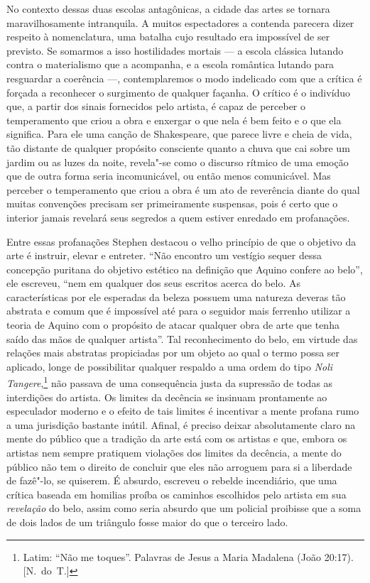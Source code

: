 No contexto dessas duas escolas antagônicas, a cidade das artes se
tornara maravilhosamente intranquila.  A muitos espectadores a contenda
parecera dizer respeito à nomenclatura, uma batalha cujo resultado era
impossível de ser previsto.  Se somarmos a isso hostilidades mortais ---
a escola clássica lutando contra o materialismo que a acompanha, e a
escola romântica lutando para resguardar a coerência ---,
contemplaremos o modo indelicado com que a crítica é forçada a
reconhecer o surgimento de qualquer façanha.  O crítico é o indivíduo
que, a partir dos sinais fornecidos pelo artista, é capaz de perceber o
temperamento que criou a obra e enxergar o que nela é bem feito e o que
ela significa.  Para ele uma canção de Shakespeare, que parece livre e
cheia de vida, tão distante de qualquer propósito consciente quanto a
chuva que cai sobre um jardim ou as luzes da noite, revela"-se como o
discurso rítmico de uma emoção que de outra forma seria incomunicável,
ou então menos comunicável.  Mas perceber o temperamento que criou a
obra é um ato de reverência diante do qual muitas convenções precisam
ser primeiramente suspensas, pois é certo que o interior jamais
revelará seus segredos a quem estiver enredado em profanações.

Entre essas profanações Stephen destacou o velho princípio de que o
objetivo da arte é instruir, elevar e entreter.  “Não encontro um		
vestígio sequer dessa concepção puritana do objetivo estético na
definição que Aquino confere ao belo”, ele escreveu, “nem em qualquer
dos seus escritos acerca do belo.  As características por ele esperadas
da beleza possuem uma natureza deveras tão abstrata e comum que é
impossível até para o seguidor mais ferrenho utilizar a teoria de
Aquino com o propósito de atacar qualquer obra de arte que tenha saído
das mãos de qualquer artista”.  Tal reconhecimento do belo, em virtude
das relações mais abstratas propiciadas por um objeto ao qual o termo
possa ser aplicado, longe de possibilitar qualquer respaldo a uma ordem
do tipo \textit{Noli Tangere},\footnote{ Latim: “Não me toques”.
Palavras de Jesus a Maria Madalena (João 20:17). [N.~do~T.]} não passava
de uma consequência justa da supressão de todas as interdições do
artista.  Os limites da decência se insinuam prontamente ao especulador
moderno e o efeito de tais limites é incentivar a mente profana rumo a
uma jurisdição bastante inútil.  Afinal, é preciso deixar absolutamente
claro na mente do público que a tradição da arte está com os artistas e
que, embora os artistas nem sempre pratiquem violações dos limites da
decência, a mente do público não tem o direito de concluir que eles não
arroguem para si a liberdade de fazê"-lo, se quiserem.  É absurdo,
escreveu o rebelde incendiário, que uma crítica baseada em homilias
proíba os caminhos escolhidos pelo artista em sua \textit{revelação} do
belo, assim como seria absurdo que um policial proibisse que a soma de
dois lados de um triângulo fosse maior do que o terceiro lado.

